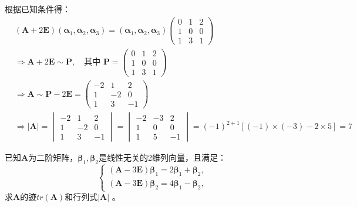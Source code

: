 \begin{solution}
    根据已知条件得：
    \begin{align*}
        &(\bm{A} +2\bm{E}) (\bm{\alpha}_1, \bm{\alpha}_2,\bm{\alpha}_3) 
        = (\bm{\alpha}_1, \bm{\alpha}_2,\bm{\alpha}_3)
        \begin{pmatrix}
            0 & 1  & 2  \\
            1  & 0 & 0  \\
            1  & 3  & 1
        \end{pmatrix} \\
        &\Rightarrow \bm{A} + 2 \bm{E} \sim \bm{P}, \quad \text{其中 } \bm{P} = 
        \begin{pmatrix}
            0 & 1  & 2  \\
            1  & 0 & 0  \\
            1  & 3  & 1
        \end{pmatrix} \\
        &\Rightarrow\bm{A} \sim \bm{P}- 2\bm{E} = \begin{pmatrix}
            -2 & 1  & 2 \\
            1  & -2 & 0 \\
            1  & 3 & -1
        \end{pmatrix} \\
        &\Rightarrow \vert \bm{A} \vert= \begin{vmatrix}
            -2 & 1  & 2 \\
            1  & -2 & 0 \\
            1  & 3 & -1
        \end{vmatrix} =\begin{vmatrix}
            -2 & -3  & 2 \\
            1  & 0 & 0 \\
            1  & 5 & -1
        \end{vmatrix}= (-1)^{2+1}[(-1)\times(-3) -2 \times 5] = 7
    \end{align*}
\end{solution}
\begin{question}
    已知$\bm{A}$为二阶矩阵，$\bm{\beta}_1,\bm{\beta}_2$是线性无关的2维列向量，且满足：
    \begin{equation*}
        \begin{cases}  %
            (\bm{A}-3 \bm{E}) \bm{\beta}_1 = 2 \bm{\beta}_1 +\bm{\beta}_2 , \\ 
            (\bm{A}-3 \bm{E}) \bm{\beta}_2 =  4 \bm{\beta}_1 - \bm{\beta}_2 ,  
        \end{cases} 
    \end{equation*}
    求\(\bm{A}\)的迹\(tr(\bm{A})\)和行列式$\vert\bm{A}\vert$ 。
\end{question}
